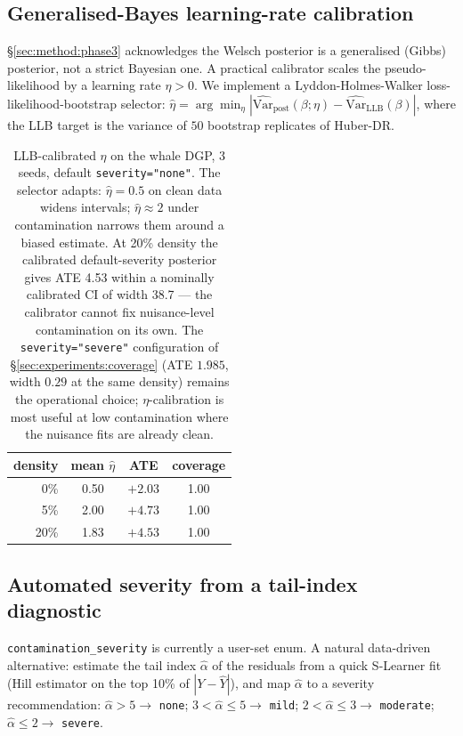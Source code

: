 \subsection{Generalised-Bayes learning-rate calibration}
\label{sec:experiments:learning_rate}
\S\ref{sec:method:phase3} acknowledges the Welsch posterior is a
generalised (Gibbs) posterior, not a strict Bayesian one. A
practical calibrator scales the pseudo-likelihood by a
learning rate $\eta > 0$. We implement a Lyddon-Holmes-Walker
\citep{lyddon2019general} loss-likelihood-bootstrap selector:
$\hat\eta = \arg\min_\eta |\widehat{\mathrm{Var}}_{\text{post}}(\beta;\eta)
- \widehat{\mathrm{Var}}_{\text{LLB}}(\beta)|$, where the LLB
target is the variance of $50$ bootstrap replicates of Huber-DR.

\begin{table}[!t]
\centering
\small
\begin{tabular}{rccc}
\toprule
density & mean $\hat\eta$ & ATE & coverage \\
\midrule
0\%   & 0.50 & $+2.03$ & 1.00 \\
5\%   & 2.00 & $+4.73$ & 1.00 \\
20\%  & 1.83 & $+4.53$ & 1.00 \\
\bottomrule
\end{tabular}
\caption{LLB-calibrated $\eta$ on the whale DGP, 3 seeds, default
\texttt{severity="none"}. The selector adapts: $\hat\eta = 0.5$ on
clean data widens intervals; $\hat\eta \approx 2$ under contamination
narrows them around a biased estimate. At 20\% density the
calibrated default-severity posterior gives ATE 4.53 within a
nominally calibrated CI of width 38.7 --- the calibrator cannot
fix nuisance-level contamination on its own. The
\texttt{severity="severe"} configuration of
\S\ref{sec:experiments:coverage} (ATE $1.985$, width $0.29$ at the
same density) remains the operational choice; $\eta$-calibration
is most useful at low contamination where the nuisance fits are
already clean.}
\label{tab:lr_calibration}
\end{table}

\subsection{Automated severity from a tail-index diagnostic}
\label{sec:experiments:auto_severity}
\texttt{contamination\_severity} is currently a user-set enum.
A natural data-driven alternative: estimate the tail index $\hat\alpha$
of the residuals from a quick S-Learner fit (Hill estimator on the
top 10\% of $|Y - \hat{Y}|$), and map $\hat\alpha$ to a severity
recommendation: $\hat\alpha > 5 \to$ \texttt{none}; $3 < \hat\alpha
\le 5 \to$ \texttt{mild}; $2 < \hat\alpha \le 3 \to$
\texttt{moderate}; $\hat\alpha \le 2 \to$ \texttt{severe}.


